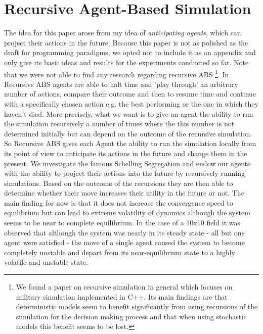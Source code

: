 \section{Recursive Agent-Based Simulation}
The idea for this paper arose from my idea of \textit{anticipating agents}, which can project their actions in the future. Because this paper is not as polished as the draft for programming paradigms, we opted not to include it as an appendix and only give its basic ideas and results for the experiments conducted so far. Note that we were not able to find any research regarding recursive ABS \footnote{We found a paper on recursive simulation in general \cite{gilmer_recursive_2000} which focuses on military simulation implemented in C++. Its main findings are that deterministic models seem to benefit significantly from using recursions of the simulation for the decision making process and that when using stochastic models this benefit seems to be lost.}.
In Recursive ABS agents are able to halt time and 'play through' an arbitrary number of actions, compare their outcome and then to resume time and continue with a specifically chosen action e.g. the best performing or the one in which they haven't died. More precisely, what we want is to give an agent the ability to run the simulation recursively a number of times where the this number is not determined initially but can depend on the outcome of the recursive simulation. So Recursive ABS gives each Agent the ability to run the simulation locally from its point of view to anticipate its actions in the future and change them in the present.
We investigate the famous Schelling Segregation \cite{schelling_dynamic_1971} and endow our agents with the ability to project their actions into the future by recursively running simulations. Based on the outcome of the recursions they are then able to determine whether their move increases their utility in the future or not. The main finding for now is that it does not increase the convergence speed to equilibrium but can lead to extreme volatility of dynamics although the system seems to be near to complete equilibrium. In the case of a 10x10 field it was observed that although the system was nearly in its steady state - all but one agent were satisfied - the move of a single agent caused the system to become completely unstable and depart from its near-equilibrium state to a highly volatile and unstable state.

